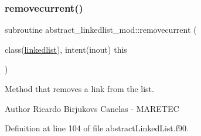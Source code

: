 \subsubsection{\texorpdfstring{removecurrent()}{removecurrent()}}
{\footnotesize\ttfamily subroutine abstract\+\_\+linkedlist\+\_\+mod\+::removecurrent (\begin{DoxyParamCaption}\item[{class(\mbox{\hyperlink{structabstract__linkedlist__mod_1_1linkedlist}{linkedlist}}), intent(inout)}]{this }\end{DoxyParamCaption})\hspace{0.3cm}{\ttfamily [private]}}



Method that removes a link from the list. 

\begin{DoxyAuthor}{Author}
Ricardo Birjukovs Canelas -\/ M\+A\+R\+E\+T\+EC 
\end{DoxyAuthor}


Definition at line 104 of file abstract\+Linked\+List.\+f90.


